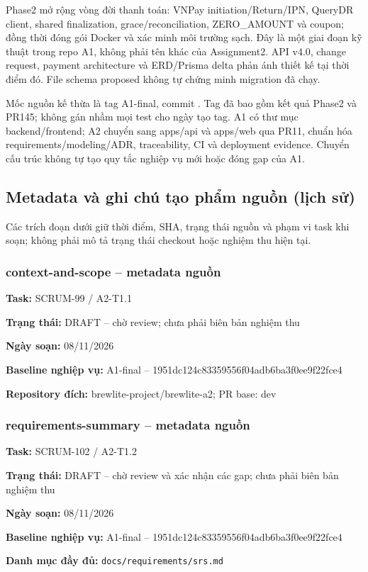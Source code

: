 Phase2 mở rộng vòng đời thanh toán: VNPay initiation/Return/IPN, QueryDR client,
shared finalization, grace/reconciliation, ZERO\_AMOUNT và coupon; đồng thời
đóng gói Docker và xác minh môi trường sạch. Đây là một giai đoạn kỹ thuật
trong repo A1, không phải tên khác của Assignment2. API v4.0, change request,
payment architecture và ERD/Prisma delta phản ánh thiết kế tại thời điểm đó.
File schema proposed không tự chứng minh migration đã chạy.

Mốc nguồn kế thừa là tag A1-final, commit
 \cite{a1repo}.
Tag đã bao gồm kết quả Phase2 và PR145; không gán nhầm mọi test cho ngày tạo tag.
A1 có thư mục backend/frontend; A2 chuyển sang apps/api và apps/web qua PR11,
chuẩn hóa requirements/modeling/ADR, traceability, CI và deployment evidence.
Chuyển cấu trúc không tự tạo quy tắc nghiệp vụ mới hoặc đóng gap của A1.


\subsection{Metadata và ghi chú tạo phẩm nguồn (lịch sử)}
Các trích đoạn dưới giữ thời điểm, SHA, trạng thái nguồn và phạm vi task
khi soạn; không phải mô tả trạng thái checkout hoặc nghiệm thu hiện tại.
\subsubsection{context-and-scope -- metadata nguồn}
\noindent\textbf{Task:} SCRUM-99 / A2-T1.1\par
\noindent\textbf{Trạng thái:} DRAFT -- chờ review; chưa phải biên bản nghiệm thu\par
\noindent\textbf{Ngày soạn:} 08/11/2026\par
\noindent\textbf{Baseline nghiệp vụ:} A1-final -- 1951dc124c83359556f04adb6ba3f0ee9f22fce4\par
\noindent\textbf{Repository đích:} brewlite-project/brewlite-a2; PR base: dev\par


\subsubsection{requirements-summary -- metadata nguồn}
\noindent\textbf{Task:} SCRUM-102 / A2-T1.2\par
\noindent\textbf{Trạng thái:} DRAFT -- chờ review và xác nhận các gap; chưa phải biên bản nghiệm thu\par
\noindent\textbf{Ngày soạn:} 08/11/2026\par
\noindent\textbf{Baseline nghiệp vụ:} A1-final -- 1951dc124c83359556f04adb6ba3f0ee9f22fce4\par
\noindent\textbf{Danh mục đầy đủ:} \texttt{docs/requirements/srs.md}\par


